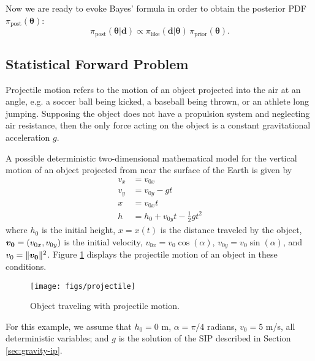 Now we are ready to evoke Bayes' formula in order to obtain the posterior PDF
$\pi_{\text{post}}(\boldsymbol{\theta})$:
\begin{equation}\label{eq-Bayes-g}
\pi_{\text{post}}(\boldsymbol{\theta}|\mathbf{d})\varpropto  \pi_{\text{like}}(\mathbf{d}|\boldsymbol{\theta}) \, \pi_{\text{prior}}(\boldsymbol{\theta}).
\end{equation}


\subsection{Statistical Forward Problem}

Projectile motion refers to the motion of an object projected into the air at an angle, e.g. a soccer ball
being kicked, a baseball being thrown, or an athlete long jumping. Supposing the object does not have a
propulsion system and neglecting air resistance, then the only force acting on the object is a
constant gravitational acceleration $g$.


A possible deterministic two-dimensional mathematical model for the vertical motion of an object projected
from near the surface of the Earth is given by
\begin{align}\label{eq:fwd01}
v_x &= v_{0x} \\ %
v_y &= v_{0y} - gt \\ %
  x &= v_{0x}t \\ %
  h &= h_0 + v_{0y}t - \frac{1}{2} g t^2  %
\end{align}
where
$h_0$ is the initial height, $x=x(t)$ is the distance traveled by the object, $\mbox{\boldmath$ v_0 $}=(v_{0x},v_{0y})$
is the initial velocity, $v_{0x} = v_{0} \cos(\alpha)$, $v_{0y} = v_{0} \sin(\alpha)$, and $v_0=\|\mbox{\boldmath$ v_0 $}\|^2$.
%
Figure \ref{fig:projectile} displays the projectile motion of an object in these conditions.
\begin{figure}[!ht]
\centering
\texttt{[image: figs/projectile]}
\vspace*{-8pt}
\caption{Object traveling with projectile motion. }
\label{fig:projectile}
\end{figure}


For this example, we assume that $h_0 =0$ m, $\alpha = \pi/4$ radians, $v_0 = 5$ m/s, all
deterministic variables; and $g$ is the solution of the SIP described in Section \ref{sec:gravity-ip}.

